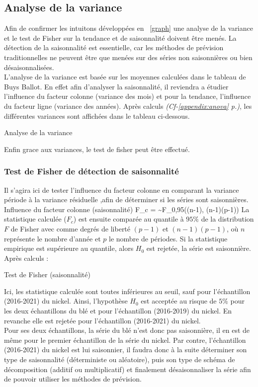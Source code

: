 \subsection{Analyse de la variance}
Afin de confirmer les intuitons développées en ~\ref{graph} une analyse de la variance et le test de Fisher sur la tendance et de 
saisonnalité doivent être menés. La détection de la saisonnalité est essentielle, car les méthodes de prévision traditionnelles
ne peuvent être que menées sur des séries non saisonnières ou bien désaisonnalisées.\\[11pt]
L'analyse de la variance est basée sur les moyennes calculées dans le tableau de Buys Ballot. En effet afin d'analyser la saisonnalité, 
il reviendra a étudier l'influence du facteur colonne (variance des mois) et pour la tendance, l'influence du facteur ligne (variance des années).
Après calculs \textit{(Cf-\ref{appendix:anova} p.\pageref{appendix:anova})}, les différentes variances sont affichées dans le tableau ci-dessous.

\begin{table}[H]
    \centering
    \caption{Analyse de la variance}
    \sffamily
    
\end{table}

Enfin grace aux variances, le test de fisher peut être effectué.

\subsubsection{Test de Fisher de détection de saisonnalité}
Il s'agira ici de tester l'influence du facteur colonne en comparant la variance période à la variance résiduelle
,afin de déterminer si les séries sont saisonnières.
    {Influence du facteur colonne (saisonnalité)}
    {F_{c} =  \sim F_{0,95}((n-1), (n-1)(p-1))}
La statistique calculée ($F_{c}$) est ensuite comparée au quantile à $95\%$ de la distribution $F$ de
Fisher avec comme degrés de liberté $(p-1)$ et $(n-1)(p-1)$, où $n$ représente le nombre d'année
et $p$ le nombre de périodes. Si la statistique empirique est supérieure au quantile,
alors $ H_{0} $ est rejetée, la série est saisonnière. Après calculs :
\begin{table}[H]
    \centering
    \caption{Test de Fisher (saisonnalité)}
    \sffamily
    
\end{table}
Ici, les statistique calculée sont toutes inférieures au seuil, sauf pour l'échantillon (2016-2021)
du nickel.  Ainsi, l'hypothèse $H_{0}$ est acceptée au risque de $5\%$ pour les deux échantillons du blé
et pour l'échantillon (2016-2019) du nickel. En revanche elle est rejetée pour l'échantillon (2016-2021) du nickel.\\[11pt]
Pour ses deux échantillons, la série du blé n'est donc pas saisonnière, il en est de même pour le premier échantillon de la série du nickel. 
Par contre, l'échantillon (2016-2021) du nickel est lui saisonnier, il faudra donc à la suite 
déterminer son type de saisonnalité (déterministe ou aléatoire), puis son type de schéma de décomposition
(additif ou multiplicatif) et finalement désaisonnaliser la série afin de pouvoir utiliser les méthodes de prévision.
